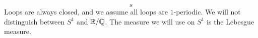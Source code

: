 \documentclass[../main-v2-manifolds.tex]{subfiles}
\begin{document}
\[
    s
\]
Loops are always closed, and we assume all loops are $1$-periodic. We will not distinguish between $S^1$ and $\mathbb{R}/\mathbb{Q}$. The measure we will use on $S^1$ is the Lebesgue measure.\\

\end{document}
